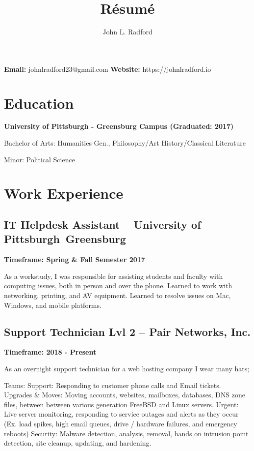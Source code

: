 \documentclass{article}
\makeatletter
\renewcommand{\maketitle}{
\begin{flushleft}
{\huge\bfseries
\theauthor}

\vspace{.25em}
\textbf{Email:} johnlradford23@gmail.com
\textbf{Website:} https://johnlradford.io 
\end{flushleft}
}
\makeatother
\begin{document}
\title{R\'esum\'e}
\author{John L. Radford}

\maketitle

\section{Education}

\noindent
\textbf{University of Pittsburgh - Greensburg Campus (Graduated: 2017)}

Bachelor of Arts: Humanities Gen., Philosophy/Art History/Classical Literature

Minor: Political Science

\section{Work Experience}

\subsection{IT Helpdesk Assistant -- University of Pittsburgh Greensburg}

\noindent
\textbf{Timeframe: Spring \& Fall Semester 2017}

As a workstudy, I was responsible for assisting students and faculty with
computing issues, both in person and over the phone. Learned to work with
networking, printing, and AV equipment. Learned to resolve issues on Mac,
Windows, and mobile platforms.

\subsection{Support Technician Lvl 2 -- Pair Networks, Inc.}

\noindent
\textbf{Timeframe: 2018 - Present}

As an overnight support technician for a web hosting company I wear many hats; 

Teams:
      Support: Responding to customer phone calls and Email tickets.
      Upgrades \& Moves: Moving accounts, websites, mailboxes, databases, DNS zone files, between between various generation FreeBSD and Linux servers.
      Urgent: Live server monitoring, responding to service outages and alerts as they occur (Ex. load spikes, high email queues, drive / hardware failures, and emergency reboots)
      Security: Malware detection, analysis, removal, hands on intrusion point detection, site cleanup, updating, and hardening.
\end{document}

